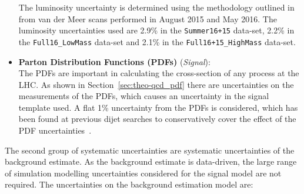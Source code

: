 \begin{itemize}[leftmargin=*]
  The luminosity uncertainty is determined using the methodology outlined in~\cite{lim-syst_lumi}
  from van der Meer scans performed in August 2015 and May 2016.
  The luminosity uncertainties used are 2.9\% in the \verb|Summer16+15| data-set,
  2.2\% in the \verb|Full16_LowMass| data-set
  and 2.1\% in the \verb|Full16+15_HighMass| data-set.
  \vspace{0.5em}
\item\textbf{Parton Distribution Functions (PDFs) } \hspace{1mm}  (\textit{Signal}):\\
  The PDFs are important in calculating the cross-section of any process at the LHC.
  As shown in Section~\ref{sec:theo-qcd_pdf} there are uncertainties on the measurements of the PDFs,
  which causes an uncertainty in the signal template used.
  A flat 1\% uncertainty from the PDFs is considered,
  which has been found at previous dijet searches to conservatively cover
  the effect of the PDF uncertainties~\cite{dijet-mori16_paper}.
  \vspace{0.5em}
\end{itemize}

The second group of systematic uncertainties are
systematic uncertainties of the background estimate.
As the background estimate is data-driven,
the large range of simulation modelling uncertainties considered for the signal model are not required.
The uncertainties on the background estimation model are:

